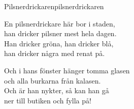 \begin{song}{Pilsnerdrickaren}{pilsnerdrickaren}
\begin{vers}
En pilsnerdrickare här bor i staden,\\
han dricker pilsner mest hela dagen.\\
Han dricker gröna, han dricker blå,\\
han dricker några med renat på.\\
\end{vers}
\begin{vers}
Och i hans fönster hänger tomma glasen\\
och alla burkarna från kalasen.\\
Och är han nykter, så kan han gå\\
ner till butiken och fylla på!\\
\end{vers}
\end{song}
